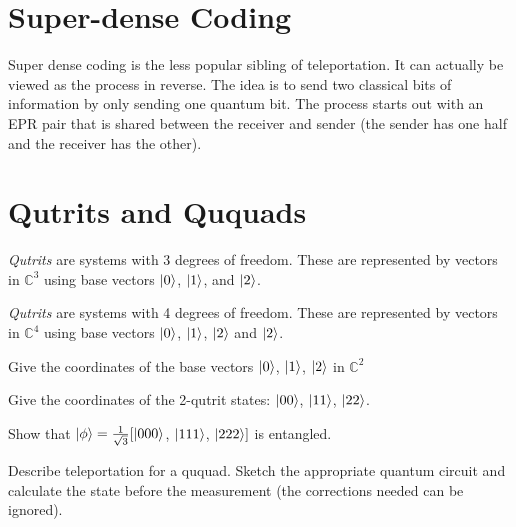 \section{Super-dense Coding}

Super dense coding is the less popular sibling of teleportation. It can actually be viewed as the
process in reverse. The idea is to send two classical bits of information by only sending one
quantum bit. The process starts out with an EPR pair that is shared between the receiver and
sender (the sender has one half and the receiver has the other).




\section{Qutrits and Ququads}

\textit{Qutrits} are systems with 3 degrees of freedom. 
These are represented by vectors in $\mathbb{C}^3$ 
using base vectors $\left|0\right\rangle$, $\left|1\right\rangle$, and $\left|2\right\rangle$. 

\textit{Qutrits} are systems with 4 degrees of freedom. 
These are represented by vectors in $\mathbb{C}^4$ 
using base vectors $\left|0\right\rangle$, $\left|1\right\rangle$, $\left|2\right\rangle$ and $\left|2\right\rangle$.  

\frmrule

\begin{example}
Give the coordinates of the base vectors $\left|0\right\rangle$, $\left|1\right\rangle$, $\left|2\right\rangle$ in $\mathbb{C}^2$ 
\end{example} 

\frmrule

\begin{example}
Give the coordinates of the 2-qutrit states: $\left|00\right\rangle$, $\left|11\right\rangle$, $\left|22\right\rangle$. 
\end{example} 

\frmrule

\begin{example}
Show that $\left|\phi\right\rangle = \frac{1}{\sqrt{3}}[\left|000\right\rangle$, $\left|111\right\rangle$, $\left|222\right\rangle]$ is entangled.
\end{example}

\frmrule 

\begin{example}
Describe teleportation for a ququad. 
Sketch the appropriate quantum circuit and calculate the 
state before the measurement (the corrections needed can be ignored).
\end{example} 



